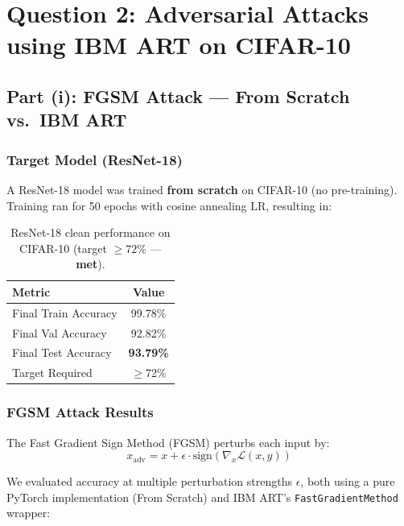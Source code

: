 \documentclass[11pt,a4paper]{article}
\begin{document}
\newpage

\section{Question 2: Adversarial Attacks using IBM ART on CIFAR-10}

\subsection{Part (i): FGSM Attack — From Scratch vs.\ IBM ART}

\subsubsection{Target Model (ResNet-18)}

A ResNet-18 model was trained \textbf{from scratch} on CIFAR-10 (no pre-training). Training ran for 50 epochs with cosine annealing LR, resulting in:

\begin{table}[H]
\centering
\begin{tabular}{@{}lc@{}}
\toprule
\textbf{Metric} & \textbf{Value} \\
\midrule
Final Train Accuracy & 99.78\% \\
Final Val Accuracy   & 92.82\% \\
Final Test Accuracy  & \textbf{93.79\%} \\
Target Required      & $\geq$72\% \\
\bottomrule
\end{tabular}
\caption{ResNet-18 clean performance on CIFAR-10 (target $\geq 72\%$ — \textbf{met}).}
\end{table}

\subsubsection{FGSM Attack Results}

The Fast Gradient Sign Method (FGSM) perturbs each input by:
$$x_{\text{adv}} = x + \epsilon \cdot \text{sign}(\nabla_x \mathcal{L}(x, y))$$

We evaluated accuracy at multiple perturbation strengths $\epsilon$, both using a pure PyTorch implementation (From Scratch) and IBM ART's \texttt{FastGradientMethod} wrapper:
\end{document}
